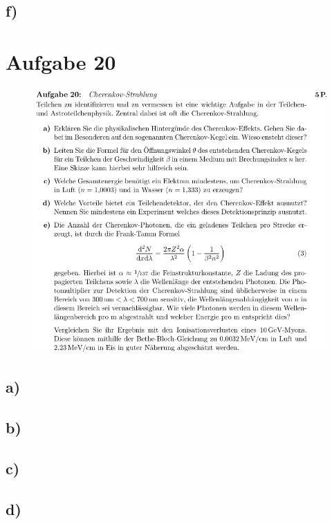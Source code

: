 \subsection{f)}


\section{Aufgabe 20}

    \begin{figure}[H]
        \centering
        \includegraphics[width=\textwidth]{images/Aufgabe20.jpg}
        \label{fig:3}
    \end{figure}


\subsection{a)}

\subsection{b)}

\subsection{c)}

\subsection{d)}

